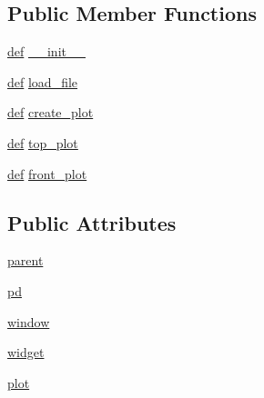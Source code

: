 \subsection*{Public Member Functions}
\begin{DoxyCompactItemize}
\item 
\hyperlink{sim_image_from_wave_8m_a72b6b8e83430abf007f20aeae4dc2f74}{def} \hyperlink{classpython_1_1models_1_1sample__chaco_1_1_sample_plotter_a8e77450fb768d9532084230c0df4d60b}{\-\_\-\-\_\-init\-\_\-\-\_\-}
\item 
\hyperlink{sim_image_from_wave_8m_a72b6b8e83430abf007f20aeae4dc2f74}{def} \hyperlink{classpython_1_1models_1_1sample__chaco_1_1_sample_plotter_aaef42097e2f5fc40c9f6c73471d744de}{load\-\_\-file}
\item 
\hyperlink{sim_image_from_wave_8m_a72b6b8e83430abf007f20aeae4dc2f74}{def} \hyperlink{classpython_1_1models_1_1sample__chaco_1_1_sample_plotter_ad1559db20fcaf50560c990a8b53558e9}{create\-\_\-plot}
\item 
\hyperlink{sim_image_from_wave_8m_a72b6b8e83430abf007f20aeae4dc2f74}{def} \hyperlink{classpython_1_1models_1_1sample__chaco_1_1_sample_plotter_ae382276213295a96061b8e697deff5a3}{top\-\_\-plot}
\item 
\hyperlink{sim_image_from_wave_8m_a72b6b8e83430abf007f20aeae4dc2f74}{def} \hyperlink{classpython_1_1models_1_1sample__chaco_1_1_sample_plotter_ab42b75d7c40ff1173c7c96bf61fcaa6c}{front\-\_\-plot}
\end{DoxyCompactItemize}
\subsection*{Public Attributes}
\begin{DoxyCompactItemize}
\item 
\hyperlink{classpython_1_1models_1_1sample__chaco_1_1_sample_plotter_a72598627a6755b564504c97dc9a2e51f}{parent}
\item 
\hyperlink{classpython_1_1models_1_1sample__chaco_1_1_sample_plotter_a15fcff607d621a791088d0750eac84a1}{pd}
\item 
\hyperlink{classpython_1_1models_1_1sample__chaco_1_1_sample_plotter_a971830a543a8257c70d6fd0aeb4a7899}{window}
\item 
\hyperlink{classpython_1_1models_1_1sample__chaco_1_1_sample_plotter_afedec87c239dc760c31d3736dab93e2a}{widget}
\item 
\hyperlink{classpython_1_1models_1_1sample__chaco_1_1_sample_plotter_aaafc3df523f88f9831b6ab04c4e73a9e}{plot}
\end{DoxyCompactItemize}
